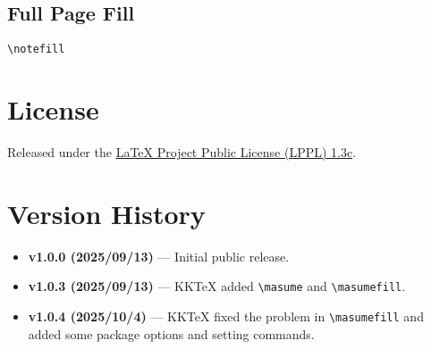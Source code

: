 \documentclass[a4paper,12pt]{article}
\begin{document}
\subsection{Full Page Fill}
\begin{verbatim}
\notefill
\end{verbatim}
\notefill

\section{License}

Released under the \href{https://www.latex-project.org/lppl/}{LaTeX Project Public License (LPPL) 1.3c}.

\section{Version History}

\begin{itemize}
    \item \textbf{v1.0.0 (2025/09/13)} --- Initial public release.
    \item \textbf{v1.0.3 (2025/09/13)} --- KKTeX added \texttt{\textbackslash masume} and \texttt{\textbackslash masumefill}.
    \item \textbf{v1.0.4 (2025/10/4)} --- KKTeX fixed the problem in \verb|\masumefill| and added some package options and setting commands.
\end{itemize}
\end{document}

